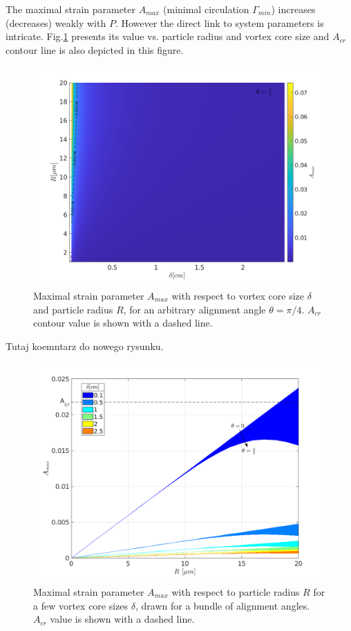 \documentclass[../main.tex]{subfiles}
\begin{document}
\noindent The maximal strain parameter $A_{max}$ (minimal circulation $\Gamma_{min}$) increases (decreases) weakly with $P$. However the direct link to system parameters is intricate. Fig.\ref{fig:ch3_10} presents its value vs. particle radius and vortex core size and $A_{cr}$ contour line is also depicted in this figure.
\begin{figure}
\centering
\noindent \includegraphics[width=30pc]{gfx/Amax_vs_delta_vs_R.png}
\caption{Maximal strain parameter $A_{max}$ with respect to vortex core size $\delta$ and particle radius $R$, for an arbitrary alignment angle $\theta=\pi/4$. $A_{cr}$ contour value is shown with a dashed line.}
\label{fig:ch3_10}
\end{figure}
Tutaj koemntarz do nowego rysunku.
\begin{figure}
\centering
\noindent \includegraphics[width=30pc]{gfx/Amax_vs_R.png}
\caption{Maximal strain parameter $A_{max}$ with respect to  particle radius $R$ for a few vortex core sizes $\delta$, drawn for a bundle of alignment angles. $A_{cr}$  value is shown with a dashed line.}
\label{fig:ch3_11}
\end{figure}
\end{document}
